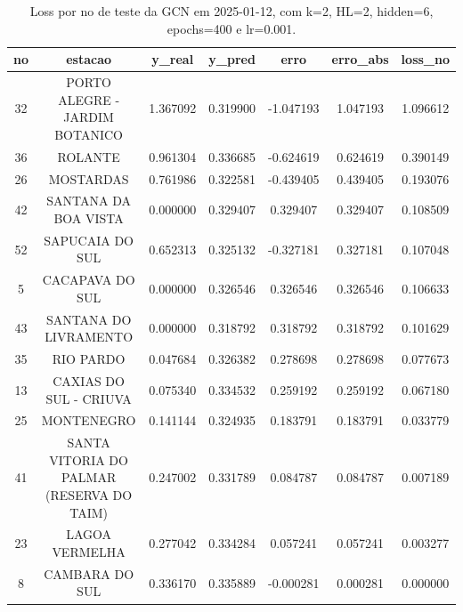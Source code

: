 \begin{table}[h]
\centering
\caption{Loss por no de teste da GCN em 2025-01-12, com k=2, HL=2, hidden=6, epochs=400 e lr=0.001.}
\label{tab:gcn_loss_k2_hl2_h6_e400_d20250112}
\begin{tabular}{ccccccc}
\toprule
no & estacao & y\_real & y\_pred & erro & erro\_abs & loss\_no \\
\midrule
32 & PORTO ALEGRE - JARDIM BOTANICO & 1.367092 & 0.319900 & -1.047193 & 1.047193 & 1.096612 \\
36 & ROLANTE & 0.961304 & 0.336685 & -0.624619 & 0.624619 & 0.390149 \\
26 & MOSTARDAS & 0.761986 & 0.322581 & -0.439405 & 0.439405 & 0.193076 \\
42 & SANTANA DA BOA VISTA & 0.000000 & 0.329407 & 0.329407 & 0.329407 & 0.108509 \\
52 & SAPUCAIA DO SUL & 0.652313 & 0.325132 & -0.327181 & 0.327181 & 0.107048 \\
5 & CACAPAVA DO SUL & 0.000000 & 0.326546 & 0.326546 & 0.326546 & 0.106633 \\
43 & SANTANA DO LIVRAMENTO & 0.000000 & 0.318792 & 0.318792 & 0.318792 & 0.101629 \\
35 & RIO PARDO & 0.047684 & 0.326382 & 0.278698 & 0.278698 & 0.077673 \\
13 & CAXIAS DO SUL - CRIUVA & 0.075340 & 0.334532 & 0.259192 & 0.259192 & 0.067180 \\
25 & MONTENEGRO & 0.141144 & 0.324935 & 0.183791 & 0.183791 & 0.033779 \\
41 & SANTA VITORIA DO PALMAR (RESERVA DO TAIM) & 0.247002 & 0.331789 & 0.084787 & 0.084787 & 0.007189 \\
23 & LAGOA VERMELHA & 0.277042 & 0.334284 & 0.057241 & 0.057241 & 0.003277 \\
8 & CAMBARA DO SUL & 0.336170 & 0.335889 & -0.000281 & 0.000281 & 0.000000 \\
\bottomrule
\end{tabular}
\end{table}
